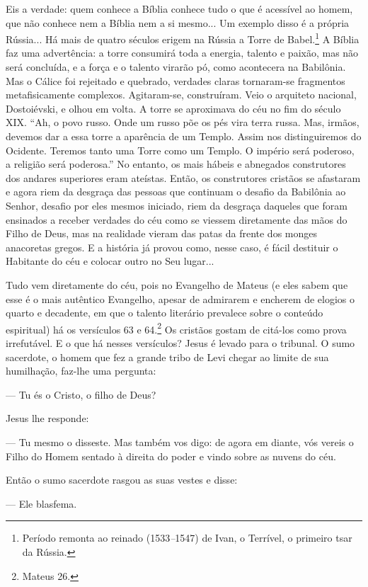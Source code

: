 Eis a verdade: quem conhece a Bíblia conhece tudo o que é acessível ao
homem, que não conhece nem a Bíblia nem a si mesmo... Um exemplo disso é
a própria Rússia... Há mais de quatro séculos erigem na Rússia a Torre
de Babel.\footnote{Período remonta ao reinado (1533\emph{--}1547) de
  Ivan, o Terrível, o primeiro tsar da Rússia.} A Bíblia faz uma
advertência: a torre consumirá toda a energia, talento e paixão, mas não
será concluída, e a força e o talento virarão pó, como acontecera na
Babilônia. Mas o Cálice foi rejeitado e quebrado, verdades claras
tornaram-se fragmentos metafisicamente complexos. Agitaram-se,
construíram. Veio o arquiteto nacional, Dostoiévski, e olhou em volta. A
torre se aproximava do céu no fim do século XIX. ``Ah, o povo russo.
Onde um russo põe os pés vira terra russa. Mas, irmãos, devemos dar a
essa torre a aparência de um Templo. Assim nos distinguiremos do
Ocidente. Teremos tanto uma Torre como um Templo. O império será
poderoso, a religião será poderosa.'' No entanto, os mais hábeis e
abnegados construtores dos andares superiores eram ateístas. Então, os
construtores cristãos se afastaram e agora riem da desgraça das pessoas
que continuam o desafio da Babilônia ao Senhor, desafio por eles mesmos
iniciado, riem da desgraça daqueles que foram ensinados a receber
verdades do céu como se viessem diretamente das mãos do Filho de Deus,
mas na realidade vieram das patas da frente dos monges anacoretas
gregos. E a história já provou como, nesse caso, é fácil destituir o
Habitante do céu e colocar outro no Seu lugar...

Tudo vem diretamente do céu, pois no Evangelho de Mateus (e eles sabem
que esse é o mais autêntico Evangelho, apesar de admirarem e encherem de
elogios o quarto e decadente, em que o talento literário prevalece sobre
o conteúdo espiritual) há os versículos 63 e 64.\footnote{Mateus 26.} Os
cristãos gostam de citá-los como prova irrefutável. E o que há nesses
versículos? Jesus é levado para o tribunal. O sumo sacerdote, o homem
que fez a grande tribo de Levi chegar ao limite de sua humilhação,
faz-lhe uma pergunta:

--- Tu és o Cristo, o filho de Deus?

Jesus lhe responde:

--- Tu mesmo o disseste. Mas também vos digo: de agora em diante, vós
vereis o Filho do Homem sentado à direita do poder e vindo sobre as
nuvens do céu.

Então o sumo sacerdote rasgou as suas vestes e disse:

--- Ele blasfema.


